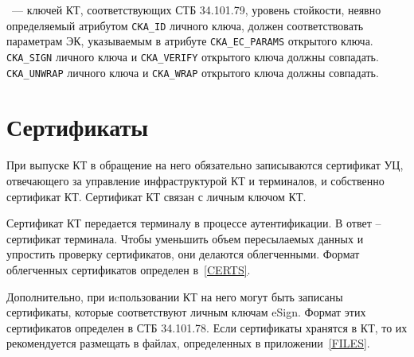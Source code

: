 \begin{note}
~---
 ключей КТ, соответствующих СТБ 34.101.79,
уровень стойкости, неявно определяемый атрибутом \verb|CKA_ID| личного ключа,
должен соответствовать параметрам ЭК, указываемым в атрибуте 
\verb|CKA_EC_PARAMS| открытого ключа.  
\verb|CKA_SIGN| личного ключа и \verb|CKA_VERIFY| открытого ключа должны 
совпадать.  \verb|CKA_UNWRAP| личного ключа и 
\verb|CKA_WRAP| открытого ключа должны совпадать. 
\end{note}


\fi 

\section{Сертификаты}\label{OBJ.Certs}

При выпуске КТ в обращение на него обязательно записываются сертификат 
УЦ, отвечающего за управление инфраструктурой КТ и терминалов,
и собственно сертификат КТ. Сертификат КТ связан с личным ключом КТ. 

Сертификат КТ передается терминалу в процессе аутентификации. 
В ответ -- сертификат терминала. Чтобы уменьшить объем пересылаемых 
данных и упростить проверку сертификатов, они делаются облегченными.
Формат облегченных сертификатов определен в~\ref{CERTS}.

Дополнительно, при иcпользовании КТ на него могут быть записаны
сертификаты, которые соответствуют личным ключам eSign.
Формат этих сертификатов определен в СТБ 34.101.78.
Если сертификаты хранятся в КТ, то их рекомендуется размещать в файлах, 
определенных в приложении~\ref{FILES}.

